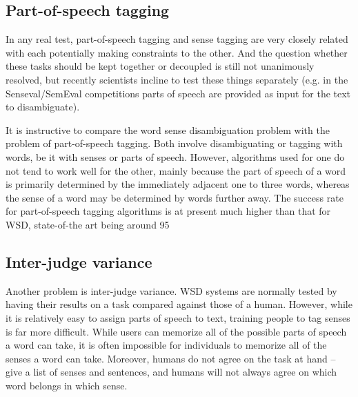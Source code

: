 \documentclass[11pt]{article}
\begin{document}
\nocite{Chali:2007:UWS:1621474.1621580,Tonelli:2009:WFI:1699510.1699547}
\printbibliography
\endrefsection




\subsection{Part-of-speech tagging}

In any real test, part-of-speech tagging and sense tagging are very closely related with each potentially making constraints to the other. And the question whether these tasks should be kept together or decoupled is still not unanimously resolved, but recently scientists incline to test these things separately (e.g. in the Senseval/SemEval competitions parts of speech are provided as input for the text to disambiguate).

It is instructive to compare the word sense disambiguation problem with the problem of part-of-speech tagging. Both involve disambiguating or tagging with words, be it with senses or parts of speech. However, algorithms used for one do not tend to work well for the other, mainly because the part of speech of a word is primarily determined by the immediately adjacent one to three words, whereas the sense of a word may be determined by words further away. The success rate for part-of-speech tagging algorithms is at present much higher than that for WSD, state-of-the art being around 95%

\nocite{Lee:2002:EEK:1118693.1118699,Liu:2005:WSD:1099554.1099696}
\printbibliography
\endrefsection




\subsection{Inter-judge variance}

Another problem is inter-judge variance. WSD systems are normally tested by having their results on a task compared against those of a human. However, while it is relatively easy to assign parts of speech to text, training people to tag senses is far more difficult. While users can memorize all of the possible parts of speech a word can take, it is often impossible for individuals to memorize all of the senses a word can take. Moreover, humans do not agree on the task at hand – give a list of senses and sentences, and humans will not always agree on which word belongs in which sense.
\end{document}
